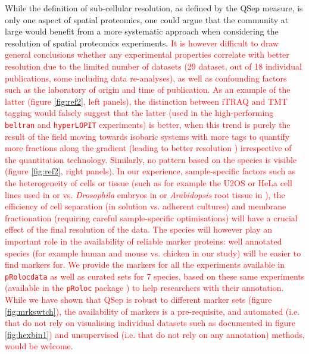 \documentclass[12pt]{article}\usepackage[]{graphicx}\usepackage[]{color}
\begin{document}
While the definition of sub-cellular resolution, as defined by the
QSep measure, is only one aspect of spatial proteomics, one could
argue that the community at large would benefit from a more systematic
approach when considering the resolution of spatial proteomics
experiments. \textcolor{red}{It is however difficult to draw general
  conclusions whether any experimental properties correlate with
  better resolution due to the limited number of datasets
  (29 dataset, out of 18 individual
  publications, some including data re-analyses), as well as
  confounding factors such as the laboratory of origin and time of
  publication. As an example of the latter (figure \ref{fig:ref2},
  left panels), the distinction between iTRAQ and TMT tagging would
  falsely suggest that the latter (used in the high-performing
  \texttt{beltran} and \texttt{hyperLOPIT} experiments) is better,
  when this trend is purely the result of the field moving towards
  isobaric systems with more tags to quantify more fractions along the
  gradient (leading to better resolution \cite{Gatto:2014})
  irrespective of the quantitation technology. Similarly, no pattern
  based on the species is visible (figure \ref{fig:ref2}, right
  panels). In our experience, sample-specific factors such as the
  heterogeneity of cells or tissue (such as for example the U2OS or
  HeLa cell lines used in \cite{Thul:2017} or \cite{Itzhak:2016}
  vs. \textit{Drosophila} embryos in \cite{Tan:2009} or
  \textit{Arabidopsis} root tissue in \cite{Groen:2014}), the
  efficiency of cell separation (in solution vs. adherent cultures)
  and membrane fractionation (requiring careful sample-specific
  optimisations) will have a crucial effect of the final resolution of
  the data. The species will however play an important role in the
  availability of reliable marker proteins: well annotated species
  (for example human and mouse vs. chicken in our study) will be
  easier to find markers for. We provide the markers for all the
  experiments available in \texttt{pRolocdata} as well as curated sets
  for 7 species, based on these same experiments (available in the
  \texttt{pRoloc} package \cite{Gatto:2014a}) to help researchers with
  their annotation. While we have shown that QSep is robust to
  different marker sets (figure \ref{fig:mrkswtch}), the availability
  of markers is a pre-requisite, and automated (i.e. that do not rely
  on visualising individual datasets such as documented in figure
  \ref{fig:hexbin1}) and unsupervised (i.e. that do not rely on any
  annotation) methods, would be welcome.}
\end{document}
